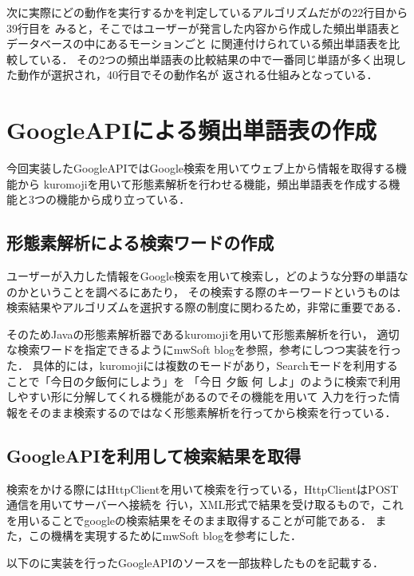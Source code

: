 次に実際にどの動作を実行するかを判定しているアルゴリズムだがの22行目から39行目を
みると，そこではユーザーが発言した内容から作成した頻出単語表とデータベースの中にあるモーションごと
に関連付けられている頻出単語表を比較している．
その2つの頻出単語表の比較結果の中で一番同じ単語が多く出現した動作が選択され，40行目でその動作名が
返される仕組みとなっている．

\section{GoogleAPIによる頻出単語表の作成}
今回実装したGoogleAPIではGoogle検索を用いてウェブ上から情報を取得する機能から
kuromojiを用いて形態素解析を行わせる機能，頻出単語表を作成する機能と3つの機能から成り立っている．

\subsection{形態素解析による検索ワードの作成}
ユーザーが入力した情報をGoogle検索を用いて検索し，どのような分野の単語なのかということを調べるにあたり，
その検索する際のキーワードというものは検索結果やアルゴリズムを選択する際の制度に関わるため，非常に重要である．

そのためJavaの形態素解析器であるkuromoji\cite{gitkuromoji}を用いて形態素解析を行い，
適切な検索ワードを指定できるようにmwSoft blog\cite{kuromoji}を参照，参考にしつつ実装を行った．
具体的には，kuromojiには複数のモードがあり，Searchモードを利用することで「今日の夕飯何にしよう」を
「今日 夕飯 何 しよ」のように検索で利用しやすい形に分解してくれる機能があるのでその機能を用いて
入力を行った情報をそのまま検索するのではなく形態素解析を行ってから検索を行っている．

\subsection{GoogleAPIを利用して検索結果を取得}
検索をかける際にはHttpClientを用いて検索を行っている，HttpClientはPOST通信を用いてサーバーへ接続を
行い，XML形式で結果を受け取るもので，これを用いることでgoogleの検索結果をそのまま取得することが可能である．
また，この機構を実現するためにmwSoft blog\cite{google}を参考にした．

以下のに実装を行ったGoogleAPIのソースを一部抜粋したものを記載する．

